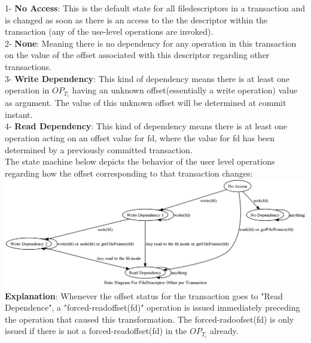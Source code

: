 \documentclass[a4paper, 11pt]{article}
\begin{document}
1- \textbf{No Access}: This is the default state for all filedescriptors in a transaction and is changed as soon as there is an access to the the descriptor within the transaction (any of the use-level operations are invoked).\\

2- \textbf{None}: Meaning there is no dependency for any operation in this transaction on the value of the offset associated with this descriptor regarding other transactions.\\ %

3- \textbf{Write Dependency}: This kind of dependency means there is at least one operation in $OP_{T_i}$ having an unknown offset(essentially a write operation) value as argument. The value of this unknown offset will be determined at commit instant. \\

4- \textbf{Read Dependency}: This kind of dependency means there is at least one operation acting on an offset value for fd, where the value for fd has been determined by a previously committed transaction.\\


The state machine below depicts the behavior of the user level operations regarding how the offset corresponding to that transaction changes: \\

\includegraphics[scale = 0.3]{hello.png}\\

\textbf{Explanation}: Whenever the offset status for the transaction goes to "Read Dependence", a "forced-readoffset(fd)" operation is issued immediately preceding the operation that caused this transformation. The forced-radoofset(fd) is only issued if there is not a forced-readoffset(fd) in the $OP_{T_i}$ already.\\ 
\end{document}

